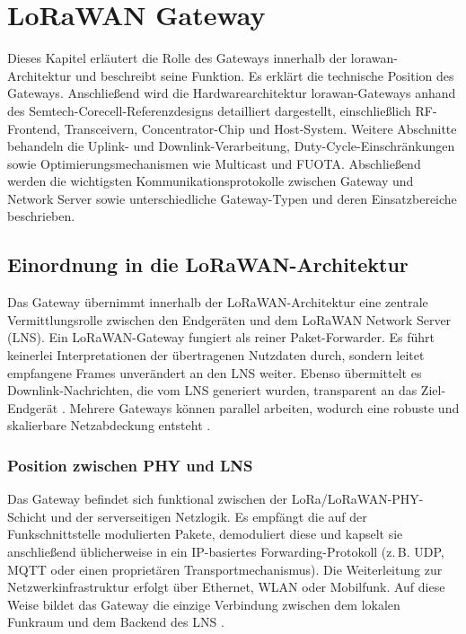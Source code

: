 %
%


\chapter{LoRaWAN Gateway \label{gateway:info}}
	Dieses Kapitel erläutert die Rolle des Gateways innerhalb der \acs{lorawan}-Architektur und beschreibt seine Funktion. Es erklärt die technische Position des Gateways. Anschlie{\ss}end wird die Hardwarearchitektur \ac{lorawan}-Gateways anhand des Semtech-Corecell-Referenzdesigns detailliert dargestellt, einschlie{\ss}lich RF-Frontend, Transceivern, Concentrator-Chip und Host-System. Weitere Abschnitte behandeln die Uplink- und Downlink-Verarbeitung, Duty-Cycle-Einschränkungen sowie Optimierungsmechanismen wie Multicast und FUOTA. Abschlie{\ss}end werden die wichtigsten Kommunikationsprotokolle zwischen Gateway und Network Server sowie unterschiedliche Gateway-Typen und deren Einsatzbereiche beschrieben.
	
\section{Einordnung in die LoRaWAN-Architektur}
	Das Gateway übernimmt innerhalb der LoRaWAN-Architektur eine zentrale Vermittlungsrolle zwischen den Endgeräten und dem LoRaWAN Network Server (LNS). Ein LoRaWAN-Gateway fungiert als reiner Paket-Forwarder. Es führt keinerlei Interpretationen der übertragenen Nutzdaten durch, sondern leitet empfangene Frames unverändert an den LNS weiter. Ebenso übermittelt es Downlink-Nachrichten, die vom LNS generiert wurden, transparent an das Ziel-Endgerät \cite{LoRaAlliance:2020c}. Mehrere Gateways können parallel arbeiten, wodurch eine robuste und skalierbare Netzabdeckung entsteht \cite{Semtech:2024}.

\subsection{Position zwischen PHY und LNS}
	Das Gateway befindet sich funktional zwischen der LoRa\-/LoRaWAN-PHY-Schicht und der serverseitigen Netzlogik. Es empfängt die auf der Funkschnittstelle modulierten Pakete, demoduliert diese und kapselt sie anschlie{\ss}end üblicherweise in ein IP-basiertes Forwarding-Protokoll (z.\,B. UDP, MQTT oder einen proprietären Transportmechanismus). Die Weiterleitung zur Netzwerkinfrastruktur erfolgt über Ethernet, WLAN oder Mobilfunk. Auf diese Weise bildet das Gateway die einzige Verbindung zwischen dem lokalen Funkraum und dem Backend des LNS \cite{LoRaAlliance:2020c} \cite{Montagny:2022} \cite{Semtech:2024}.

